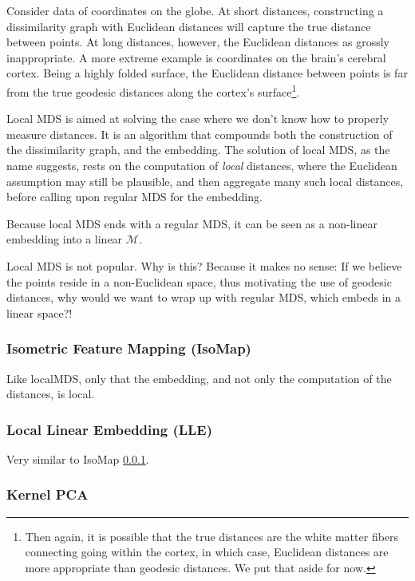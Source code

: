 \documentclass[]{book}
\theoremstyle{definition}
\theoremstyle{definition}
\theoremstyle{remark}
\let\BeginKnitrBlock\begin \let\EndKnitrBlock\end
\begin{document}
\BeginKnitrBlock{example}
\protect\hypertarget{ex:non-euclidean}{}{\label{ex:non-euclidean}}Consider
data of coordinates on the globe. At short distances, constructing a
dissimilarity graph with Euclidean distances will capture the true
distance between points. At long distances, however, the Euclidean
distances as grossly inappropriate. A more extreme example is
coordinates on the brain's cerebral cortex. Being a highly folded
surface, the Euclidean distance between points is far from the true
geodesic distances along the cortex's surface\footnote{Then again, it is
  possible that the true distances are the white matter fibers
  connecting going within the cortex, in which case, Euclidean distances
  are more appropriate than geodesic distances. We put that aside for
  now.}.
\EndKnitrBlock{example}

Local MDS is aimed at solving the case where we don't know how to
properly measure distances. It is an algorithm that compounds both the
construction of the dissimilarity graph, and the embedding. The solution
of local MDS, as the name suggests, rests on the computation of
\emph{local} distances, where the Euclidean assumption may still be
plausible, and then aggregate many such local distances, before calling
upon regular MDS for the embedding.

Because local MDS ends with a regular MDS, it can be seen as a
non-linear embedding into a linear \(\mathcal{M}\).

Local MDS is not popular. Why is this? Because it makes no sense: If we
believe the points reside in a non-Euclidean space, thus motivating the
use of geodesic distances, why would we want to wrap up with regular
MDS, which embeds in a linear space?!

\subsubsection{Isometric Feature Mapping (IsoMap)}\label{isomap}

Like localMDS, only that the embedding, and not only the computation of
the distances, is local.

\subsubsection{Local Linear Embedding
(LLE)}\label{local-linear-embedding-lle}

Very similar to IsoMap \ref{isomap}.

\subsubsection{Kernel PCA}\label{kernel-pca}
\end{document}
